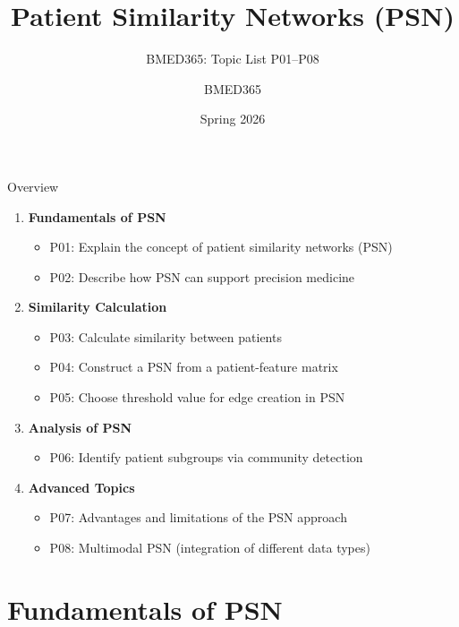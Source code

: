 \documentclass[aspectratio=169, 10pt]{beamer}
\title{Patient Similarity Networks (PSN)}
\subtitle{BMED365: Topic List P01--P08}
\author{BMED365}
\date{Spring 2026}
\begin{document}
\begin{frame}
    \titlepage
\end{frame}

\begin{frame}{Overview}
    \begin{enumerate}
        \item \textbf{Fundamentals of PSN}
        \begin{itemize}
            \item P01: Explain the concept of patient similarity networks (PSN)
            \item P02: Describe how PSN can support precision medicine
        \end{itemize}
        \item \textbf{Similarity Calculation}
        \begin{itemize}
            \item P03: Calculate similarity between patients
            \item P04: Construct a PSN from a patient-feature matrix
            \item P05: Choose threshold value for edge creation in PSN
        \end{itemize}
        \item \textbf{Analysis of PSN}
        \begin{itemize}
            \item P06: Identify patient subgroups via community detection
        \end{itemize}
        \item \textbf{Advanced Topics}
        \begin{itemize}
            \item P07: Advantages and limitations of the PSN approach
            \item P08: Multimodal PSN (integration of different data types)
        \end{itemize}
    \end{enumerate}
\end{frame}

\section{Fundamentals of PSN}
\end{document}
